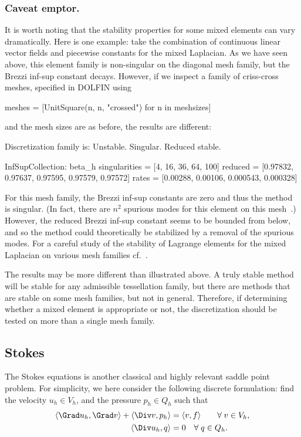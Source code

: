 \subsubsection*{Caveat emptor.}
It is worth noting that the stability properties for some mixed
elements can vary dramatically. Here is one example: take the
combination of continuous linear vector fields and piecewise constants
for the mixed Laplacian. As we have seen above, this element family is
non-singular on the diagonal mesh family, but the Brezzi inf-sup
constant decays. However, if we inspect a family of criss-cross
meshes, specified in DOLFIN using
\begin{python}
meshes = [UnitSquare(n, n, "crossed") for n in meshsizes]
\end{python}
and the mesh sizes are as before, the results are different:
\begin{python}
Discretization family is: Unstable. Singular. Reduced stable.

InfSupCollection: beta_h
singularities = [4, 16, 36, 64, 100]
reduced =        [0.97832, 0.97637, 0.97595, 0.97579, 0.97572]
rates  =         [0.00288, 0.00106, 0.000543, 0.000328]
\end{python}
For this mesh family, the Brezzi inf-sup constants are zero and thus
the method is singular. (In fact, there are $n^2$ spurious modes for
this element on this mesh~\cite{Qin1994}.) However, the reduced
Brezzi inf-sup constant seems to be bounded from below, and so the
method could theoretically be stabilized by a removal of the spurious
modes. For a careful study of the stability of Lagrange elements for
the mixed Laplacian on various mesh families
cf.~\cite{ArnoldRognes2009}.

The results may be more different than illustrated above. A truly
stable method will be stable for any admissible tessellation family,
but there are methods that are stable on some mesh families, but not in
general.  Therefore, if determining whether a mixed element is
appropriate or not, the discretization should be tested on more than a
single mesh family.

\subsection{Stokes}

The Stokes equations is another classical and highly relevant saddle
point problem. For simplicity, we here consider the following discrete
formulation: find the velocity $u_h \in V_h$, and the pressure $p_h
\in Q_h$ such that
\begin{equation}
  \label{rognes:eq:stokes}
  \begin{split}
    \langle \Grad u_h, \Grad v \rangle + \langle \Div v, p_h \rangle &=
    \langle v, f \rangle
    \quad\quad \foralls v \in V_h, \\
    \langle \Div u_h, q \rangle &= 0
    \quad \foralls q \in Q_h.
  \end{split}
\end{equation}

